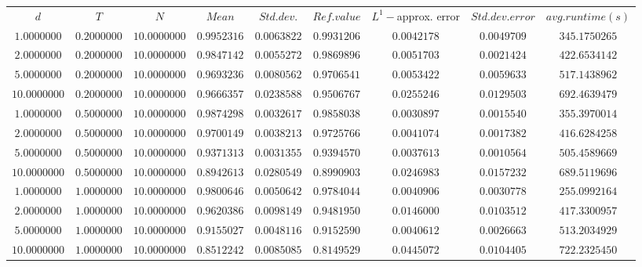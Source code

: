 \begin{tabular}{ccccccccc}
$d$ & $T$ & $N$ & $Mean$ & $Std. dev.$ & $Ref. value$ & $L^1-$approx. error & $Std. dev. error$ & $avg. runtime (s)$\\
$1.0000000$ & $0.2000000$ & $10.0000000$ & $0.9952316$ & $0.0063822$ & $0.9931206$ & $0.0042178$ & $0.0049709$ & $345.1750265$\\
$2.0000000$ & $0.2000000$ & $10.0000000$ & $0.9847142$ & $0.0055272$ & $0.9869896$ & $0.0051703$ & $0.0021424$ & $422.6534142$\\
$5.0000000$ & $0.2000000$ & $10.0000000$ & $0.9693236$ & $0.0080562$ & $0.9706541$ & $0.0053422$ & $0.0059633$ & $517.1438962$\\
$10.0000000$ & $0.2000000$ & $10.0000000$ & $0.9666357$ & $0.0238588$ & $0.9506767$ & $0.0255246$ & $0.0129503$ & $692.4639479$\\
$1.0000000$ & $0.5000000$ & $10.0000000$ & $0.9874298$ & $0.0032617$ & $0.9858038$ & $0.0030897$ & $0.0015540$ & $355.3970014$\\
$2.0000000$ & $0.5000000$ & $10.0000000$ & $0.9700149$ & $0.0038213$ & $0.9725766$ & $0.0041074$ & $0.0017382$ & $416.6284258$\\
$5.0000000$ & $0.5000000$ & $10.0000000$ & $0.9371313$ & $0.0031355$ & $0.9394570$ & $0.0037613$ & $0.0010564$ & $505.4589669$\\
$10.0000000$ & $0.5000000$ & $10.0000000$ & $0.8942613$ & $0.0280549$ & $0.8990903$ & $0.0246983$ & $0.0157232$ & $689.5119696$\\
$1.0000000$ & $1.0000000$ & $10.0000000$ & $0.9800646$ & $0.0050642$ & $0.9784044$ & $0.0040906$ & $0.0030778$ & $255.0992164$\\
$2.0000000$ & $1.0000000$ & $10.0000000$ & $0.9620386$ & $0.0098149$ & $0.9481950$ & $0.0146000$ & $0.0103512$ & $417.3300957$\\
$5.0000000$ & $1.0000000$ & $10.0000000$ & $0.9155027$ & $0.0048116$ & $0.9152590$ & $0.0040612$ & $0.0026663$ & $513.2034929$\\
$10.0000000$ & $1.0000000$ & $10.0000000$ & $0.8512242$ & $0.0085085$ & $0.8149529$ & $0.0445072$ & $0.0104405$ & $722.2325450$\\
\end{tabular}
